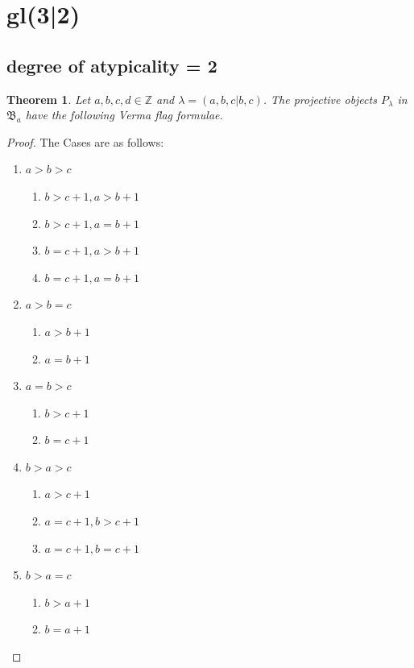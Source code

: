 \documentclass[12pt,a4paper]{article}
\newtheorem{theorem}{Theorem}[section]
\begin{document}
\section{gl(3|2)}
\subsection{degree of atypicality = 2}

\begin{theorem}
  Let $a,b,c,d \in \mathbb{Z}$ and $\lambda = (a,b,c|b,c)$. The projective objects $P_{\lambda}$ in $\mathfrak{B}_{a}$ have the following Verma flag formulae.
\end{theorem}
\begin{proof} The Cases are as follows:\par
\begin{enumerate}
  \item $a>b>c$
    \begin{enumerate}
      \item $b>c+1 ,a>b+1$
      \item $b>c+1 ,a=b+1$
      \item $b=c+1 ,a>b+1$
      \item $b=c+1 ,a=b+1$
    \end{enumerate}

  \item $a>b=c$
    \begin{enumerate}
      \item $a>b+1$
      \item $a=b+1$
    \end{enumerate}

  \item $a=b>c$
    \begin{enumerate}
      \item $b>c+1$
      \item $b=c+1$
    \end{enumerate}

  \item $b>a>c$
    \begin{enumerate}
      \item $a>c+1$
      \item $a=c+1, b>c+1$
      \item $a=c+1, b=c+1$
    \end{enumerate}

  \item $b>a=c$
    \begin{enumerate}
      \item $b>a+1$
      \item $b=a+1$
    \end{enumerate}


\end{enumerate}
\end{proof}
\end{document}

